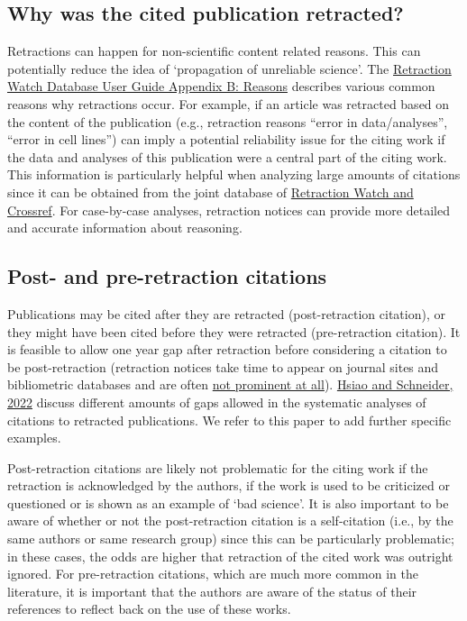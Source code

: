 \documentclass[letterpaper, 12pt]{article}
\begin{document}
\subsection*{Why was the cited publication retracted?} 

Retractions can happen for non-scientific content related reasons. This can potentially reduce the idea of ‘propagation of unreliable science’. The \href{https://retractionwatch.com/retraction-watch-database-user-guide/retraction-watch-database-user-guide-appendix-b-reasons/}{Retraction Watch Database User Guide Appendix B: Reasons} describes various common reasons why retractions occur. For example, if an article was retracted based on the content of the publication (e.g., retraction reasons ``error in data/analyses'', ``error in cell lines'') can imply a potential reliability issue for the citing work if the data and analyses of this publication were a central part of the citing work. This information is particularly helpful when analyzing large amounts of citations since it can be obtained from the joint database of \href{https://gitlab.com/crossref/retraction-watch-data}{Retraction Watch and Crossref}. For case-by-case analyses, retraction notices can provide more detailed and accurate information about reasoning. 

\subsection*{Post- and pre-retraction citations}

Publications may be cited after they are retracted (post-retraction citation), or they might have been cited before they were retracted (pre-retraction citation). 
It is feasible to allow one year gap after retraction before considering a citation to be post-retraction (retraction notices take time to appear on journal sites and bibliometric databases and are often \href{https://retractionwatch.com/2024/07/05/how-you-can-help-improve-the-visibility-of-retractions-introducing-nisos-recommended-practice-for-communication-of-retractions-removals-and-expressions-of-concern-crec/}{not prominent at all}). \href{ https://doi.org/10.1162/qss_a_00155}{Hsiao and Schneider, 2022} discuss different amounts of gaps allowed in the systematic analyses of citations to retracted publications. We refer to this paper to add further specific examples.  

Post-retraction citations are likely not problematic for the citing work if the retraction is acknowledged by the authors, if the work is used to be criticized or questioned or is shown as an example of `bad science'. It is also important to be aware of whether or not the post-retraction citation is a self-citation (i.e., by the same authors or same research group) since this can be particularly problematic; in these cases, the odds are higher that retraction of the cited work was outright ignored. For pre-retraction citations, which are much more common in the literature, it is important that the authors are aware of the status of their references to reflect back on the use of these works. 
\end{document}
